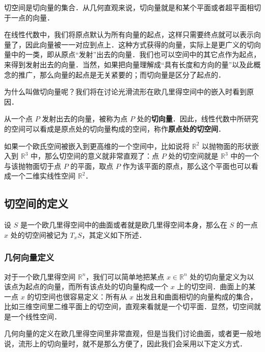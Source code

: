 

切空间是切向量的集合．从几何直观来说，切向量就是和某个平面或者超平面相切于一点的向量．

在线性代数中，我们将原点默认为所有向量的起点，这样只需要终点就可以表示向量了，因此向量被一一对应到点上．这种方式获得的向量，实际上是更广义的切向量中的一类，即从原点“发射”出去的向量．我们也可以空间中的其它点作为起点，来得到发射出去的向量．当然，如果把向量理解成“具有长度和方向的量”以及此概念的推广，那么向量的起点是无关紧要的；而切向量是区分了起点的．

为什么叫做切向量呢？我们将在讨论光滑流形在欧几里得空间中的嵌入时看到原因．%

从一个点 $P$ 发射出去的向量，被称为点 $P$ 处的\textbf{切向量}．因此，线性代数中所研究的空间可以看成是原点处的切向量构成的空间，称作\textbf{原点处的切空间}．

如果一个欧氏空间被嵌入到更高维的一个空间中，比如说将 $\mathbb{R}^2$ 以抛物面的形状嵌入到 $\mathbb{R}^3$ 中，那么切空间的意义就非常直观了：点 $P$ 处的切空间就是 $\mathbb{R}^3$ 中的一个与该抛物面切于点 $P$ 的平面，取点 $P$ 作为该平面的原点，那么这个平面也可以看成一个二维实线性空间 $\mathbb{R}^2$．

\subsection{切空间的定义}

设 $S$ 是一个欧几里得空间中的曲面或者就是欧几里得空间本身，那么在 $S$ 的一点 $x$ 处的切空间被记为 $T_xS$，其定义如下所述．

\subsubsection{几何向量定义}

对于一个欧几里得空间 $\mathbb{R}^n$，我们可以简单地把某点 $x\in\mathbb{R}^n$ 处的切向量定义为以该点为起点的向量，而所有该点处的切向量构成一个 $x$ 上的切空间．曲面上的某一点 $x$ 的切空间也很容易定义：所有从 $x$ 出发且和曲面相切的向量构成的集合，比如三维空间里二维平面上的切空间，直观来看就是一个切平面．显然，切空间就是一个线性空间．

几何向量的定义在欧几里得空间里非常直观，但是当我们讨论曲面，或者更一般地说，流形上的切向量时，就不是那么方便了，因此我们会采用以下定义方式．


